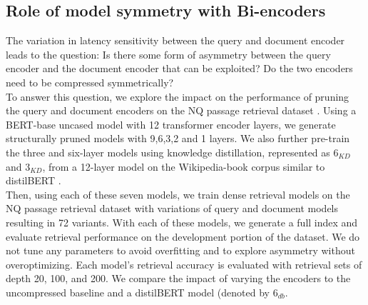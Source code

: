 \subsection{Role of model symmetry with Bi-encoders}
The variation in latency sensitivity between the query and document encoder leads to the question: Is there some form of asymmetry between the query encoder and the document encoder that can be exploited? Do the two encoders need to be compressed symmetrically? \\
To answer this question, we explore the impact on the performance of pruning the query and document encoders on the NQ passage retrieval dataset \cite{Kwiatkowski2019NaturalQA}. Using a BERT-base uncased model with 12 transformer encoder layers, we generate structurally pruned models with 9,6,3,2 and 1 layers. We also further pre-train the three and six-layer models using knowledge distillation, represented as $6_{KD}$ and $3_{KD}$, from a 12-layer model on the Wikipedia-book corpus similar to distilBERT \cite{sanh2019distilbert}. \\
Then, using each of these seven models, we train dense retrieval models on the NQ passage retrieval dataset with variations of query and document models resulting in 72 variants. With each of these models, we generate a full index and evaluate retrieval performance on the development portion of the dataset. We do not tune any parameters to avoid overfitting and to explore asymmetry without overoptimizing. Each model's retrieval accuracy is evaluated with retrieval sets of depth 20, 100, and 200. We compare the impact of varying the encoders to the uncompressed baseline and a distilBERT model (denoted by $6_{db}$. \\
